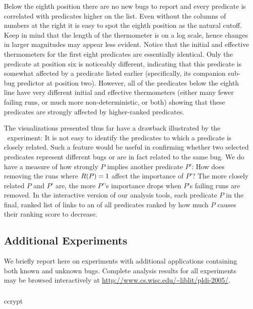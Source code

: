 Below the eighth position there are no new bugs to report and every
predicate is correlated with predicates higher on the list.  Even
without the columns of numbers at the right it is easy to spot the
eighth position as the natural cutoff.  Keep in mind that the length
of the thermometer is on a log scale, hence changes in larger
magnitudes may appear less evident.  Notice that the initial and
effective thermometers for the first eight predicates are essentially
identical.  Only the predicate at position six is noticeably
different, indicating that this predicate is somewhat affected by a
predicate listed earlier (specifically, its companion sub-bug
predictor at position two).  However, all of the predicates below the
eighth line have very different initial and effective thermometers
(either many fewer failing runs, or much more non-deterministic, or
both) showing that these predicates are strongly affected by
higher-ranked predicates.

The visualizations presented thus far have a drawback illustrated by
the \moss\ experiment: It is not easy to identify the predicates to
which a predicate is closely related.  Such a feature would be useful
in confirming whether two selected predicates represent different bugs
or are in fact related to the same bug.  We do have a measure of how
strongly $P$ implies another predicate $P'$: How does removing the
runs where $R(P) = 1$ affect the importance of $P'$?  The more
closely related $P$ and $P'$ are, the more $P'$'s importance drops
when $P$'s failing runs are removed.  In the interactive version of
our analysis tools, each predicate $P$ in the final, ranked list of
links to an  of all
predicates ranked by how much $P$ causes their ranking score to
decrease.

\subsection{Additional Experiments}

We briefly report here on experiments with additional applications
containing both known and unknown bugs.  Complete analysis results for
all experiments may be browsed interactively at
\url{http://www.cs.wisc.edu/~liblit/pldi-2005/}.

\subsubsection{\ccrypt}

\begin{view}{\ccrypt}{ccrypt}
  
\end{view}

